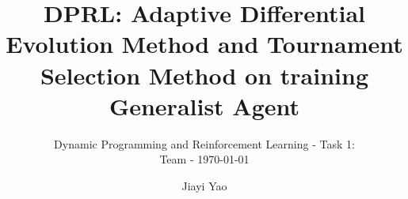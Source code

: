 \documentclass[sigconf]{acmart}
\begin{document}
\title{DPRL: Adaptive Differential Evolution Method and Tournament Selection Method on training Generalist Agent}
\subtitle{Dynamic Programming and Reinforcement Learning - Task 1: \\Team  - \today}

\author{Jiayi Yao}




\maketitle



\end{document}
